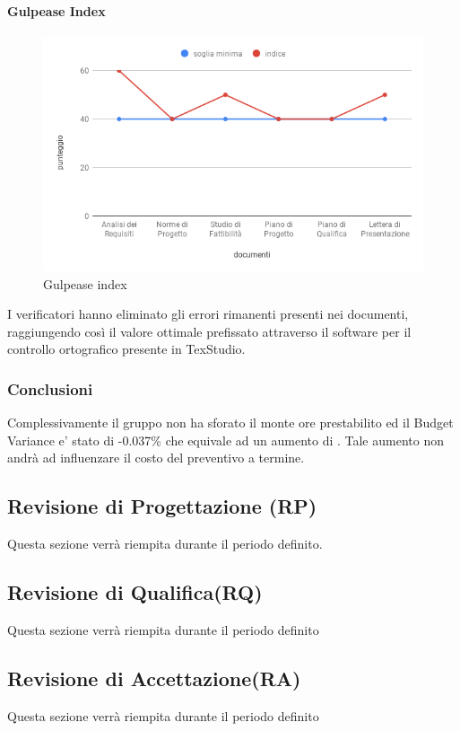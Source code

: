 \paragraph{Gulpease Index}
\hspace{15cm}
\begin{figure}[!htbp]
	\centering
	\includegraphics[scale=0.5]{GulpeaseIndex.png}
	\caption{Gulpease index}
\end{figure}

 I verificatori hanno eliminato gli errori rimanenti presenti nei documenti, raggiungendo così il valore ottimale prefissato attraverso il software per il controllo ortografico presente in TexStudio. 
 
\subsubsection{Conclusioni}
Complessivamente il gruppo non ha sforato il monte ore prestabilito ed il Budget Variance e' stato di -0.037\% che equivale ad un aumento di . Tale aumento non andrà ad influenzare il costo del preventivo a termine. 
\clearpage
\subsection{Revisione di Progettazione (RP)}
Questa sezione verrà riempita durante il periodo definito.
\subsection{Revisione di Qualifica(RQ)}
Questa sezione verrà riempita durante il periodo definito
\subsection{Revisione di Accettazione(RA)}
Questa sezione verrà riempita durante il periodo definito

